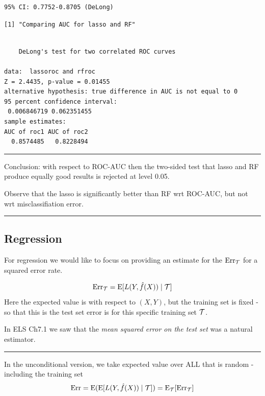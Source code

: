\documentclass[
  letterpaper,
  DIV=11,
  numbers=noendperiod]{scrartcl}
\begin{document}
\begin{verbatim}
95% CI: 0.7752-0.8705 (DeLong)
\end{verbatim}

\begin{verbatim}
[1] "Comparing AUC for lasso and RF"
\end{verbatim}

\begin{verbatim}

    DeLong's test for two correlated ROC curves

data:  lassoroc and rfroc
Z = 2.4435, p-value = 0.01455
alternative hypothesis: true difference in AUC is not equal to 0
95 percent confidence interval:
 0.006846719 0.062351455
sample estimates:
AUC of roc1 AUC of roc2 
  0.8574485   0.8228494 
\end{verbatim}

\begin{center}\rule{0.5\linewidth}{0.5pt}\end{center}

Conclusion: with respect to ROC-AUC then the two-sided test that lasso
and RF produce equally good results is rejected at level 0.05.

Observe that the lasso is significantly better than RF wrt ROC-AUC, but
not wrt misclassifiation error.

\begin{center}\rule{0.5\linewidth}{0.5pt}\end{center}

\hypertarget{regression-1}{%
\subsection{Regression}\label{regression-1}}

For regression we would like to focus on providing an estimate for the
\(\text{Err}_{\cal T}\) for a squared error rate.

\[ \text{Err}_{\cal T}=\text{E}[L(Y,\hat{f}(X))\mid {\cal T}]\] Here the
expected value is with respect to \((X,Y)\), but the training set is
fixed - so that this is the test set error is for this specific training
set \({\cal T}\).

In ELS Ch7.1 we saw that the \emph{mean squared error on the test set}
was a natural estimator.

\begin{center}\rule{0.5\linewidth}{0.5pt}\end{center}

In the unconditional version, we take expected value over ALL that is
random - including the training set
\[ \text{Err}=\text{E}(\text{E}[L(Y,\hat{f}(X))\mid {\cal T}])=\text{E}_{\cal T} [\text{Err}_{\cal T}]\]
\end{document}
